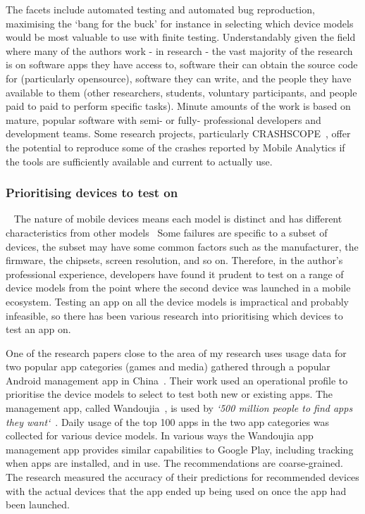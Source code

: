 The facets include automated testing and automated bug reproduction, maximising the `bang for the buck' for instance in selecting which device models would be most valuable to use with finite testing. Understandably given the field where many of the authors work - in research - the vast majority of the research is on software apps they have access to, software their can obtain the source code for (particularly opensource), software they can write, and the people they have available to them (other researchers, students, voluntary participants, and people paid to paid to perform specific tasks). Minute amounts of the work is based on mature, popular software with semi- or fully- professional developers and development teams. Some research projects, particularly CRASHSCOPE~, offer the potential to reproduce some of the crashes reported by Mobile Analytics if the tools are sufficiently available and current to actually use.


\subsubsection{Prioritising devices to test on}~\label{rw-prioritising-devices-to-test-on-topic}
The nature of mobile devices means each model is distinct and has different characteristics from other models~ Some failures are specific to a subset of devices, the subset may have some common factors such as the manufacturer, the firmware, the chipsets, screen resolution, and so on. Therefore, in the author's professional experience, developers have found it prudent to test on a range of device models from the point where the second device was launched in a mobile ecosystem. Testing an app on all the device models is impractical and probably infeasible, so there has been various research into prioritising which devices to test an app on.

One of the research papers close to the area of my research uses usage data for two popular app categories (games and media) gathered through a popular Android management app in China~. Their work used an operational profile to prioritise the device models to select to test both new or existing apps. The management app, called Wandoujia~, is used by \emph{`500 million people to find apps they want`}~. Daily usage of the top 100 apps in the two app categories was collected for various device models. In various ways the Wandoujia app management app provides similar capabilities to Google Play, including tracking when apps are installed, and in use. The recommendations are coarse-grained. The research measured the accuracy of their predictions for recommended devices with the actual devices that the app ended up being used on once the app had been launched. 

